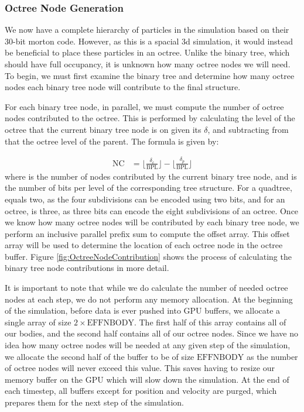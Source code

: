 \documentclass{thesis}
\begin{document}
\subsubsection{Octree Node Generation}
We now have a complete hierarchy of particles in the simulation based on their 30-bit morton code. However, as this is a spacial 3d simulation, it would instead be beneficial to place these particles in an octree. Unlike the binary tree, which should have full occupancy, it is unknown how many octree nodes we will need. To begin, we must first examine the binary tree and determine how many octree nodes each binary tree node will contribute to the final structure.

For each binary tree node, in parallel, we must compute the number of octree nodes contributed to the octree. This is performed by calculating the level of the octree that the current binary tree node is on given its $\delta$, and subtracting from that the octree level of the parent. The formula is given by:

\begin{align}
    \label{eq:NodeContributions}
    \text{NC} &= \lfloor\frac{\delta_c}{\text{BPL}}\rfloor - \lfloor\frac{\delta_p}{\text{BPL}}\rfloor
\end{align}
where  is the number of nodes contributed by the current binary tree node, and  is the number of bits per level of the corresponding tree structure. For a quadtree,  equals two, as the four subdivisions can be encoded using two bits, and for an octree,  is three, as three bits can encode the eight subdivisions of an octree. Once we know how many octree nodes will be contributed by each binary tree node, we perform an inclusive parallel prefix sum to compute the offset array. This offset array will be used to determine the location of each octree node in the octree buffer. Figure \ref{fig:OctreeNodeContribution} shows the process of calculating the binary tree node contributions in more detail.

It is important to note that while we do calculate the number of needed octree nodes at each step, we do not perform any memory allocation. At the beginning of the simulation, before data is ever pushed into GPU buffers, we allocate a single array of size $2\times \text{EFFNBODY}$. The first half of this array contains all of our bodies, and the second half contains all of our octree nodes. Since we have no idea how many octree nodes will be needed at any given step of the simulation, we allocate the second half of the buffer to be of size $\text{EFFNBODY}$ as the number of octree nodes will never exceed this value. This saves having to resize our memory buffer on the GPU which will slow down the simulation. At the end of each timestep, all buffers except for position and velocity are purged, which prepares them for the next step of the simulation. 
\end{document}
